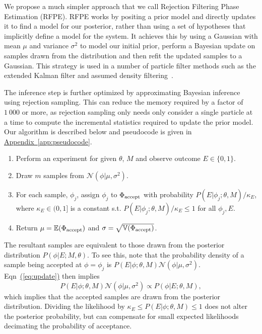 \documentclass[aps,pra,amsmath,twocolumn,amssymb,superscriptaddress]{revtex4-1}
\newcommand{\eq}[1]{\hyperref[eq:#1]{(\ref*{eq:#1})}}
\newcommand{\app}[1]{\hyperref[app:#1]{Appendix~\ref*{app:#1}}}
\begin{document}
We propose a much simpler approach that we call Rejection Filtering Phase
Estimation (RFPE). RFPE works by positing a prior model and directly updates it
to find a model for our posterior, rather than using a set of hypotheses that implicitly
define a model for the system.  It achieves this by using a
Gaussian with mean $\mu$ and variance $\sigma^2$ to model our initial prior, perform a Bayesian update on samples
drawn from the distribution and then refit the updated samples to a Gaussian.
This strategy is used in a number of particle filter methods such as the extended Kalman filter and assumed density
filtering~\cite{haykin2004kalman,opper1998bayesian}.  

The inference step is further optimized by approximating Bayesian inference using rejection
sampling.  This can reduce the memory required by a factor of $1~000$ or more,
as rejection sampling only needs only consider a single particle at a time to compute the incremental statistics required
to update the prior model. Our algorithm is described
below and pseudocode is given in \app{pseudocode}.





\begin{enumerate}
\item Perform an experiment for given $\theta$, $M$ and observe outcome $E\in \{0,1\}$.
\item Draw $m$ samples from $\mathcal{N}(\phi|\mu,\sigma^2)$.
\item For each sample, $\phi_j$, assign $\phi_j$ to $\Phi_{\rm accept}$ with probability $P(E|\phi_j;\theta,M)/\kappa_E$, where $\kappa_E\in (0,1]$ is a constant s.t. $P(E|\phi_j;\theta,M)/\kappa_E\le 1$ for all $\phi_j,E$.
\item Return $\mu = \mathbb{E}(\Phi_{\rm accept})$ and $\sigma =\sqrt{\mathbb{V}(\Phi_{\rm accept})}$.
\end{enumerate}

The resultant samples are equivalent to those drawn from the posterior distribution
$P(\phi|E;M,\theta)$.  To see this, note that the probability density of a sample being accepted at $\phi=\phi_j$ is $ P(E | \phi; \theta, M) \mathcal{N}(\phi|\mu,\sigma^2)$.  Eqn~\eq{update} then implies 
\begin{equation}
    P(E | \phi; \theta, M) \mathcal{N}(\phi|\mu,\sigma^2) \propto P(\phi | E; \theta, M),
\end{equation}
which implies that the accepted samples are drawn from the posterior distribution.  Dividing the likelihood by $\kappa_E\le P(E|\phi;\theta,M)\le 1$ does not alter the posterior probability, but can compensate for small expected likelihoods decimating the probability of acceptance.
\end{document}

